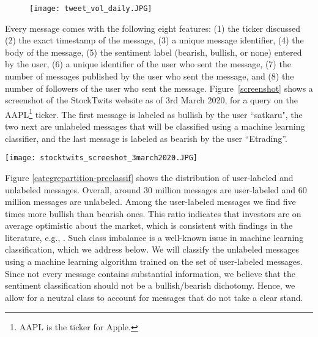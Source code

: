  \begin{figure}
    \centering
    \texttt{[image: tweet\_vol\_daily.JPG]}
    \label{fig:tweet_vol_daily}
\end{figure}

Every message comes with the following eight features: (1) the ticker discussed (2) the exact timestamp of the message, (3) a unique message identifier, (4) the body of the message, (5) the sentiment label (bearish, bullish, or none) entered by the user, (6) a unique identifier of the user who sent the message, (7) the number of messages published by the user who sent the message, and (8) the number of followers of the user who sent the message. Figure~\ref{screenshot} shows a screenshot of the StockTwits website as of 3rd March 2020, for a query on the AAPL\footnote{AAPL is the ticker for Apple.} ticker. The first message is labeled as bullish by the user ``satkaru", the two next are unlabeled messages that will be classified using a machine learning classifier, and the last message is labeled as bearish by the user ``Etrading''. 

\begin{figure*}[h]
\centering
\texttt{[image: stocktwits\_screeshot\_3march2020.JPG]}
\label{screenshot}
\end{figure*}




Figure \ref{categrepartition-preclassif} shows the distribution of user-labeled and unlabeled messages. Overall, around 30 million messages are user-labeled and 60 million messages are unlabeled. Among the user-labeled messages we find five times more bullish than bearish ones. This ratio indicates that investors are on average optimistic about the market, which is consistent with findings in the literature, e.g., \citet{renault2017intraday}. Such class imbalance is a well-known issue in machine learning classification, which we address below. We will classify the unlabeled messages using a machine learning algorithm trained on the set of user-labeled messages. Since not every message contains substantial information, we believe that the sentiment classification should not be a bullish/bearish dichotomy. Hence, we allow for a neutral class to account for messages that do not take a clear stand.

